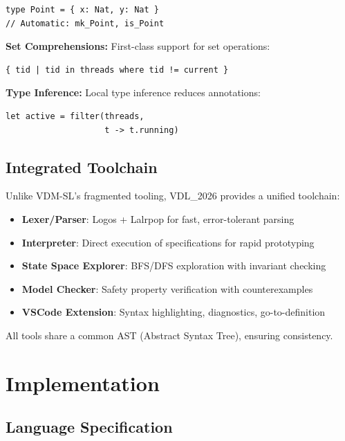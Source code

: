 \documentclass[conference]{IEEEtran}
\begin{document}
\begin{lstlisting}[caption={Structural type system}]
type Point = { x: Nat, y: Nat }
// Automatic: mk_Point, is_Point
\end{lstlisting}

\textbf{Set Comprehensions:} First-class support for set operations:

\begin{lstlisting}[caption={Set comprehensions}]
{ tid | tid in threads where tid != current }
\end{lstlisting}

\textbf{Type Inference:} Local type inference reduces annotations:

\begin{lstlisting}[caption={Type inference}]
let active = filter(threads,
                    t -> t.running)
\end{lstlisting}

\subsection{Integrated Toolchain}

Unlike VDM-SL's fragmented tooling, VDL\_2026 provides a unified toolchain:

\begin{itemize}
\item \textbf{Lexer/Parser}: Logos + Lalrpop for fast, error-tolerant parsing
\item \textbf{Interpreter}: Direct execution of specifications for rapid prototyping
\item \textbf{State Space Explorer}: BFS/DFS exploration with invariant checking
\item \textbf{Model Checker}: Safety property verification with counterexamples
\item \textbf{VSCode Extension}: Syntax highlighting, diagnostics, go-to-definition
\end{itemize}

All tools share a common AST (Abstract Syntax Tree), ensuring consistency.

\section{Implementation}
\label{sec:implementation}

\subsection{Language Specification}
\end{document}

